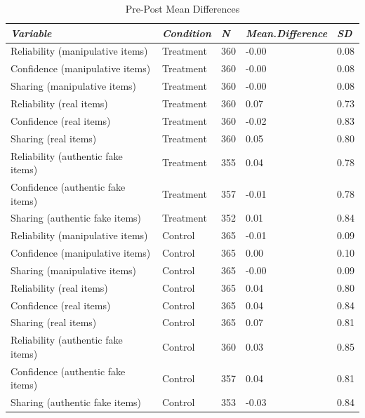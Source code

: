 \documentclass[empirical, authordate]{jote-new-article}
\begin{document}
\begin{table}

  \caption{Pre-Post Mean Differences}
  \label{tab:tableS25}


  \begin{tabularx}{\linewidth}{@{} X  l  l  l  l@{}}

    \toprule
    \emph{Variable}                    & \emph{Condition} & \emph{N} & \emph{Mean.Difference} & \emph{SD} \\
    \midrule
    Reliability (manipulative items)   & Treatment        & 360      & -0.00                  & 0.08      \\
    Confidence (manipulative items)    & Treatment        & 360      & -0.00                  & 0.08      \\
    Sharing (manipulative items)       & Treatment        & 360      & -0.00                  & 0.08      \\
    Reliability (real items)           & Treatment        & 360      & 0.07                   & 0.73      \\
    Confidence (real items)            & Treatment        & 360      & -0.02                  & 0.83      \\
    Sharing (real items)               & Treatment        & 360      & 0.05                   & 0.80      \\
    Reliability (authentic fake items) & Treatment        & 355      & 0.04                   & 0.78      \\
    Confidence (authentic fake items)  & Treatment        & 357      & -0.01                  & 0.78      \\
    Sharing (authentic fake items)     & Treatment        & 352      & 0.01                   & 0.84      \\
    Reliability (manipulative items)   & Control          & 365      & -0.01                  & 0.09      \\
    Confidence (manipulative items)    & Control          & 365      & 0.00                   & 0.10      \\
    Sharing (manipulative items)       & Control          & 365      & -0.00                  & 0.09      \\
    Reliability (real items)           & Control          & 365      & 0.04                   & 0.80      \\
    Confidence (real items)            & Control          & 365      & 0.04                   & 0.84      \\
    Sharing (real items)               & Control          & 365      & 0.07                   & 0.81      \\
    Reliability (authentic fake items) & Control          & 360      & 0.03                   & 0.85      \\
    Confidence (authentic fake items)  & Control          & 357      & 0.04                   & 0.81      \\
    Sharing (authentic fake items)     & Control          & 353      & -0.03                  & 0.84      \\
    \bottomrule
  \end{tabularx}


\end{table}
\end{document}
